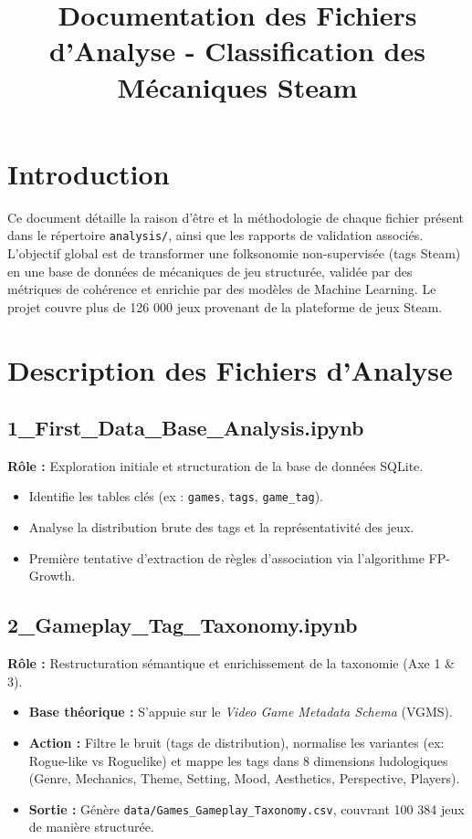 \documentclass{article}
\title{Documentation des Fichiers d'Analyse - Classification des Mécaniques Steam}
\begin{document}
\maketitle

\section{Introduction}
Ce document détaille la raison d'être et la méthodologie de chaque fichier présent dans le répertoire \texttt{analysis/}, ainsi que les rapports de validation associés. L'objectif global est de transformer une folksonomie non-supervisée (tags Steam) en une base de données de mécaniques de jeu structurée, validée par des métriques de cohérence et enrichie par des modèles de Machine Learning. Le projet couvre plus de 126 000 jeux provenant de la plateforme de jeux Steam.

\section{Description des Fichiers d'Analyse}

\subsection{1\_First\_Data\_Base\_Analysis.ipynb}
	\textbf{Rôle :} Exploration initiale et structuration de la base de données SQLite.
\begin{itemize}
    \item Identifie les tables clés (ex : \texttt{games}, \texttt{tags}, \texttt{game\_tag}).
    \item Analyse la distribution brute des tags et la représentativité des jeux.
    \item Première tentative d'extraction de règles d'association via l'algorithme FP-Growth.
\end{itemize}

\subsection{2\_Gameplay\_Tag\_Taxonomy.ipynb}
	\textbf{Rôle :} Restructuration sémantique et enrichissement de la taxonomie (Axe 1 \& 3).
\begin{itemize}
    \item \textbf{Base théorique :} S'appuie sur le \textit{Video Game Metadata Schema} (VGMS).
    \item \textbf{Action :} Filtre le bruit (tags de distribution), normalise les variantes (ex: Rogue-like vs Roguelike) et mappe les tags dans 8 dimensions ludologiques (Genre, Mechanics, Theme, Setting, Mood, Aesthetics, Perspective, Players).
    \item \textbf{Sortie :} Génère \texttt{data/Games\_Gameplay\_Taxonomy.csv}, couvrant 100 384 jeux de manière structurée.
\end{itemize}
\end{document}
